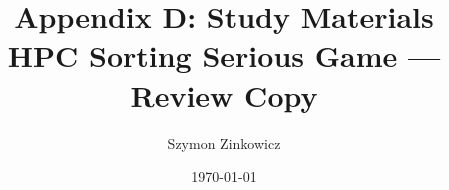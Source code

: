 \documentclass[oneside]{article}
\title{Appendix D: Study Materials\\[0.5em]\large HPC Sorting Serious Game --- Review Copy}
\author{Szymon Zinkowicz}
\date{\today}
\begin{document}
\maketitle
\tableofcontents
\newpage

\renewcommand{\thesection}{D.\arabic{section}}



\end{document}
